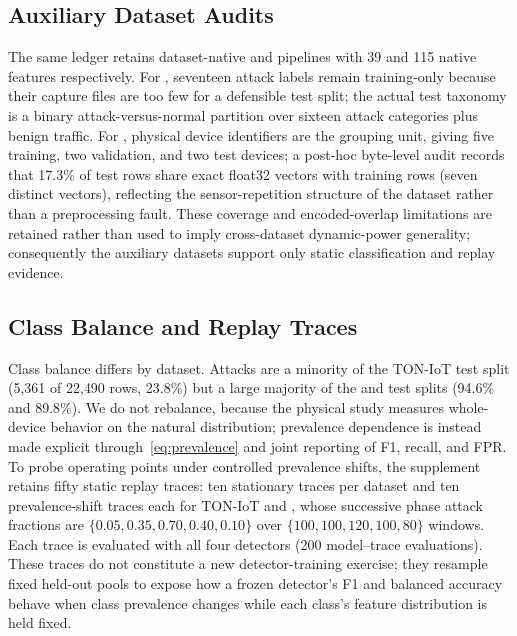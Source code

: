 \subsection{Auxiliary Dataset Audits}
The same ledger retains dataset-native \cic{} and \nb{} pipelines with 39 and 115 native features respectively. For \cic{}, seventeen attack labels remain training-only because their capture files are too few for a defensible test split; the actual test taxonomy is a binary attack-versus-normal partition over sixteen attack categories plus benign traffic. For \nb{}, physical device identifiers are the grouping unit, giving five training, two validation, and two test devices; a post-hoc byte-level audit records that 17.3\% of \nb{} test rows share exact float32 vectors with training rows (seven distinct vectors), reflecting the sensor-repetition structure of the dataset rather than a preprocessing fault. These coverage and encoded-overlap limitations are retained rather than used to imply cross-dataset dynamic-power generality; consequently the auxiliary datasets support only static classification and replay evidence.

\subsection{Class Balance and Replay Traces}
Class balance differs by dataset. Attacks are a minority of the TON-IoT test split (5{,}361 of 22{,}490 rows, 23.8\%) but a large majority of the \cic{} and \nb{} test splits (94.6\% and 89.8\%). We do not rebalance, because the physical study measures whole-device behavior on the natural distribution; prevalence dependence is instead made explicit through~\eqref{eq:prevalence} and joint reporting of F1, recall, and FPR. To probe operating points under controlled prevalence shifts, the supplement retains fifty static replay traces: ten stationary traces per dataset and ten prevalence-shift traces each for TON-IoT and \cic{}, whose successive phase attack fractions are $\{0.05, 0.35, 0.70, 0.40, 0.10\}$ over $\{100, 100, 120, 100, 80\}$ windows. Each trace is evaluated with all four detectors (200 model--trace evaluations). These traces do not constitute a new detector-training exercise; they resample fixed held-out pools to expose how a frozen detector's F1 and balanced accuracy behave when class prevalence changes while each class's feature distribution is held fixed.
